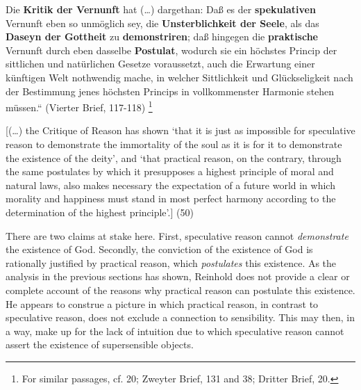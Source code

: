 Die \textbf{Kritik der Vernunft }hat (\ldots ) dargethan: \quotedblbase Da\ss{} es der \textbf{spekulativen }Vernunft eben so unm\"{o}glich sey, die \textbf{Unsterblichkeit der Seele}, als das \textbf{Daseyn der Gottheit} zu \textbf{demonstriren}; da\ss{} hingegen die \textbf{praktische} Vernunft durch eben dasselbe \textbf{Postulat}, wodurch sie ein h\"{o}chstes Princip der sittlichen und nat\"{u}rlichen Gesetze voraussetzt, auch die Erwartung einer k\"{u}nftigen Welt nothwendig mache, in welcher Sittlichkeit und Gl\"{u}ckseligkeit nach der Bestimmung jenes h\"{o}chsten Princips in vollkommenster Harmonie stehen m\"{u}ssen.`` (Vierter Brief, 117{-}118) \footnote{ For similar passages, cf. 20; Zweyter Brief, 131 and 38; Dritter Brief, 20.}

[(\ldots ) the Critique of Reason has shown `that it is just as impossible for speculative reason to demonstrate the immortality of the soul as it is for it to demonstrate the existence of the deity', and `that practical reason, on the contrary, through the same postulates by which it presupposes a highest principle of moral and natural laws, also makes necessary the expectation of a future world in which morality and happiness must stand in most perfect harmony according to the determination of the highest principle'.] (50)

There are two claims at stake here. First, speculative reason cannot \textit{demonstrate} the existence of God. Secondly, the conviction of the existence of God is rationally justified by practical reason, which \textit{postulates} this existence. As the analysis in the previous sections has shown, Reinhold does not provide a clear or complete account of the reasons why practical reason can postulate this existence. He appears to construe a picture in which practical reason, in contrast to speculative reason, does not exclude a connection to sensibility. This may then, in a way, make up for the lack of intuition due to which speculative reason cannot assert the existence of supersensible objects. 

